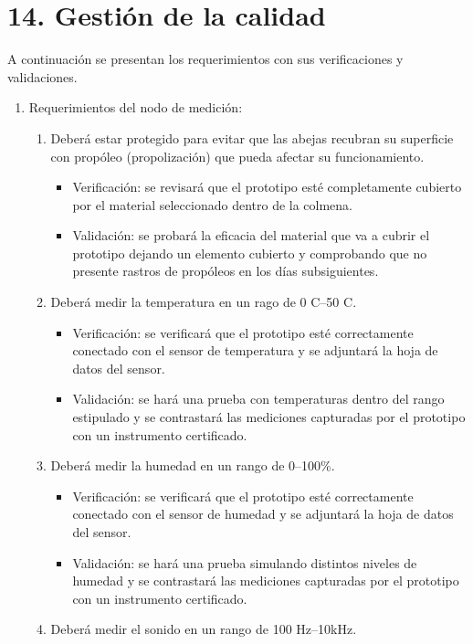 \documentclass[
11pt, %
codirector, %
]{charter}
\begin{document}
\section{14. Gestión de la calidad}
\label{sec:calidad}

A continuación se presentan los requerimientos con sus verificaciones y validaciones.

\begin{enumerate}
	\item Requerimientos del nodo de medición:
		\begin{enumerate}
			\item Deberá estar protegido para evitar que las abejas recubran su superficie con propóleo (propolización) que pueda afectar su funcionamiento.
				\begin{itemize}
					\item Verificación: se revisará que el prototipo esté completamente cubierto por el material seleccionado dentro de la colmena.
					\item Validación: se probará la eficacia del material que va a cubrir el prototipo dejando un elemento cubierto y comprobando que no presente rastros de propóleos en los días subsiguientes.
				\end{itemize}
			\item Deberá medir la temperatura en un rago de 0 \textdegree{}C--50 \textdegree{}C.
				\begin{itemize}
					\item Verificación: se verificará que el prototipo esté correctamente conectado con el sensor de temperatura y se adjuntará la hoja de datos del sensor.
					\item Validación: se hará una prueba con temperaturas dentro del rango estipulado y se contrastará las mediciones capturadas por el prototipo con un instrumento certificado.
				\end{itemize}			
			\item Deberá medir la humedad en un rango de 0--100\%.
				\begin{itemize}
					\item Verificación: se verificará que el prototipo esté correctamente conectado con el sensor de humedad y se adjuntará la hoja de datos del sensor.
					\item Validación: se hará una prueba simulando distintos niveles de humedad y se contrastará las mediciones capturadas por el prototipo con un instrumento certificado.
				\end{itemize}			
			\item Deberá medir el sonido en un rango de 100 Hz--10kHz.

\end{enumerate}
\end{enumerate}
\end{document}
